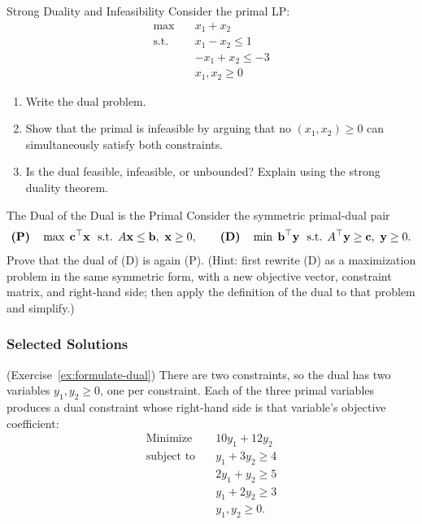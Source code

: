 \begin{ex}{Strong Duality and Infeasibility}{}
 Consider the primal LP:
\[
\begin{aligned}
\max \quad & x_1 + x_2 \\
\text{s.t.} \quad & x_1 - x_2 \leq 1 \\
& -x_1 + x_2 \leq -3 \\
& x_1, x_2 \geq 0
\end{aligned}
\]
\begin{enumerate}
\item Write the dual problem.
\item Show that the primal is infeasible by arguing that no $(x_1, x_2) \geq 0$ can simultaneously satisfy both constraints.
\item Is the dual feasible, infeasible, or unbounded? Explain using the strong duality theorem.
\end{enumerate}
\end{ex}


\begin{ex}{The Dual of the Dual is the Primal}{}
\label{ex:dual-of-dual}
 Consider the symmetric primal-dual pair
\[
\textbf{(P)} \quad \max \; \mathbf{c}^\top \mathbf{x} \ \mbox{ s.t. } A\mathbf{x} \leq \mathbf{b}, \ \mathbf{x} \geq 0,
\qquad
\textbf{(D)} \quad \min \; \mathbf{b}^\top \mathbf{y} \ \mbox{ s.t. } A^\top \mathbf{y} \geq \mathbf{c}, \ \mathbf{y} \geq 0.
\]
Prove that the dual of (D) is again (P).  (Hint: first rewrite (D) as a maximization problem in the same symmetric form, with a new objective vector, constraint matrix, and right-hand side; then apply the definition of the dual to that problem and simplify.)
\exrefs{\S\ref{sec:duality-strong}, \S\ref{sec:duality-forms}}
\end{ex}

\subsubsection*{Selected Solutions}

\begin{solution}(Exercise~\ref{ex:formulate-dual})
There are two constraints, so the dual has two variables $y_1, y_2 \geq 0$, one per constraint.  Each of the three primal variables produces a dual constraint whose right-hand side is that variable's objective coefficient:
\[
\begin{aligned}
\text{Minimize} \quad & 10y_1 + 12y_2 \\
\text{subject to} \quad
& y_1 + 3y_2 \geq 4 \\
& 2y_1 + y_2 \geq 5 \\
& y_1 + 2y_2 \geq 3 \\
& y_1, y_2 \geq 0.
\end{aligned}
\]
\end{solution}

